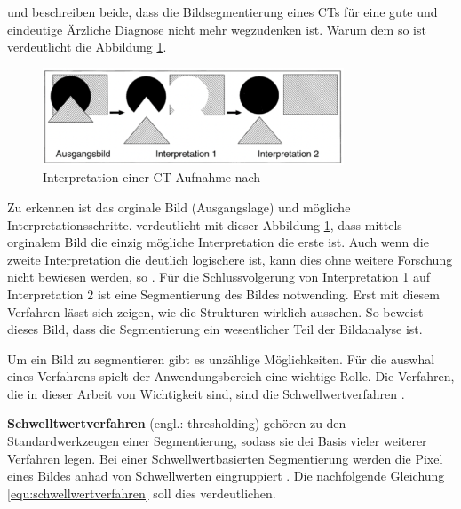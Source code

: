 \citet[Seite 95]{handels2000} und \citet[Seite 360]{lehmann2013bildverarbeitung}
beschreiben beide, dass die Bildsegmentierung eines CTs für eine gute und
eindeutige Ärzliche Diagnose nicht mehr wegzudenken ist. Warum dem so ist verdeutlicht
die Abbildung \ref{fig:interpretation_einer_ct_aufnahem}.

\begin{figure}[h]
	\centering
	\includegraphics[width=0.8\textwidth]{img/bild_interpretation.jpg}
	\caption{Interpretation einer CT-Aufnahme nach \citet[Seite 360]{lehmann2013bildverarbeitung}}
	\label{fig:interpretation_einer_ct_aufnahem}
\end{figure}

Zu erkennen ist das orginale Bild (Ausgangslage) und mögliche
Interpretationsschritte. \citet[Seite 360]{lehmann2013bildverarbeitung} verdeutlicht
mit dieser Abbildung \ref{fig:interpretation_einer_ct_aufnahem}, dass mittels
orginalem Bild die einzig mögliche Interpretation die erste ist. Auch wenn die zweite
Interpretation die deutlich logischere ist, kann dies ohne weitere Forschung
nicht bewiesen werden, so \citet[Seite 360]{lehmann2013bildverarbeitung}. Für
die Schlussvolgerung von Interpretation 1 auf Interpretation 2 ist eine
Segmentierung des Bildes notwending. Erst mit diesem Verfahren lässt sich zeigen,
wie die Strukturen wirklich aussehen. So beweist dieses Bild, dass die
Segmentierung ein wesentlicher Teil der Bildanalyse ist.

Um ein Bild zu segmentieren gibt es unzählige Möglichkeiten. Für die auswhal eines
Verfahrens spielt der Anwendungsbereich eine wichtige Rolle. Die Verfahren, die in
dieser Arbeit von Wichtigkeit sind, sind die Schwellwertverfahren \citep[vgl.][Seite
361]{lehmann2013bildverarbeitung}.

\textbf{Schwelltwertverfahren} (engl.: thresholding) gehören zu den Standardwerkzeugen
einer Segmentierung, sodass sie dei Basis vieler weiterer Verfahren legen. Bei einer
Schwellwertbasierten Segmentierung werden die Pixel eines Bildes anhad von Schwellwerten
eingruppiert \citep[vgl.][Seite 96]{handels2000}. Die nachfolgende Gleichung
\ref{equ:schwellwertverfahren} soll dies verdeutlichen.

